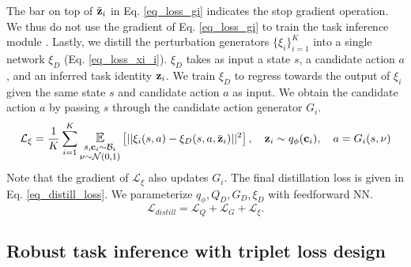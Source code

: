 The bar on top of $\bar{\bf z}_i$ in Eq. \ref{eq_loss_gi} indicates the stop gradient operation. We thus do not use the gradient of Eq. \ref{eq_loss_gi} to train the task inference module \cite{rakelly2019efficient}. Lastly, we distill the perturbation generators $\{\xi_i\}^K_{i=1}$ into a single network $\xi_D$ (Eq. \ref{eq_loss_xi_i}).
$\xi_D$ takes as input a state $s$, a candidate action $a$, and an inferred task identity ${\bf z}_i$. We train $\xi_D$ to regress towards the output of $\xi_i$ given the same state $s$ and candidate action $a$ as input.
We obtain the candidate action $a$ by passing $s$ through the candidate action generator $G_i$.
\begin{equation}\label{eq_loss_xi_i}
    \mathcal{L}_\xi = \frac{1}{K} \sum_{i=1}^{K} \mathlarger{\underset{\substack{s, {\bf c}_{i} \sim \mathcal{B}_i \\ \nu \sim \mathcal{N}(0,1)} }{\mathbb{E}}}\left[ || \xi_i(s, a) - \xi_D(s, a, \bar{\bf z}_i) || ^ 2 \right], \quad {\bf z}_i \sim q_\phi({\bf c}_{i}), \quad a = G_i(s, \nu)
\end{equation}
Note that the gradient of $\mathcal{L}_\xi$ also updates $G_i$. The final distillation loss is given in Eq. \ref{eq_distill_loss}. We parameterize $q_\phi, Q_D, G_D, \xi_D$ with feedforward NN.
\begin{equation}\label{eq_distill_loss}
    \mathcal{L}_{distill} = \mathcal{L}_Q + \mathcal{L}_G + \mathcal{L}_\xi.
\end{equation}

\subsection{Robust task inference with triplet loss design}\label{sec_algo_triplet}

